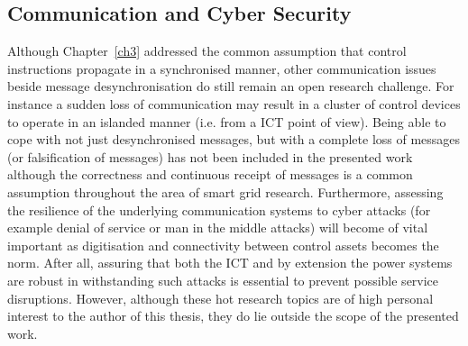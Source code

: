 \subsection{Communication and Cyber Security}

Although Chapter~\ref{ch3} addressed the common assumption that control instructions propagate in a synchronised manner, other communication issues beside message desynchronisation do still remain an open research challenge.
For instance a sudden loss of communication may result in a cluster of control devices to operate in an islanded manner (i.e. from a ICT point of view).
Being able to cope with not just desynchronised messages, but with a complete loss of messages (or falsification of messages) has not been included in the presented work although the correctness and continuous receipt of messages is a common assumption throughout the area of smart grid research.
Furthermore, assessing the resilience of the underlying communication systems to cyber attacks (for example denial of service or man in the middle attacks) will become of vital important as digitisation and connectivity between control assets becomes the norm.
After all, assuring that both the ICT and by extension the power systems are robust in withstanding such attacks is essential to prevent possible service disruptions.
However, although these hot research topics are of high personal interest to the author of this thesis, they do lie outside the scope of the presented work.
